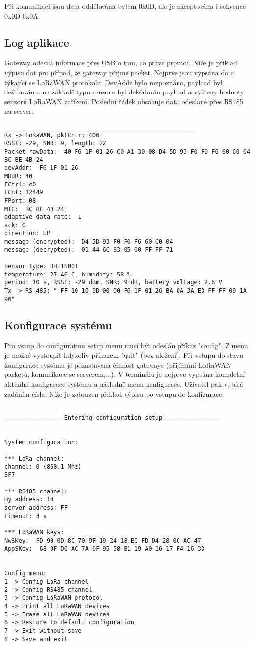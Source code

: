 Při komunikaci jsou data oddělována bytem 0x0D, ale je akceptována i sekvence 0x0D 0x0A. 

\subsection{Log aplikace}
Gateway odesílá informace přes USB o tom, co právě provádí. Níže je příklad výpisu dat pro případ, že gateway přijme packet. Nejprve jsou vypsána data týkající se LoRaWAN protokolu, DevAddr bylo rozpoznáno, payload byl dešifrován a na základě typu senzoru byl dekódován payload a vyčteny hodnoty senzorů LoRaWAN zařízení. Poslední řádek obsahuje data odeslané přes RS485 na server.


\begin{lstlisting}
______________________________________________________
Rx -> LoRaWAN, pktCntr: 406
RSSI: -29, SNR: 9, length: 22
Packet rawData:  40 F6 1F 01 26 C0 A1 30 08 D4 5D 93 F0 F0 F6 60 C0 04 BC BE 4B 24
devAddr:  F6 1F 01 26
MHDR: 40
FCtrl: c0
FCnt: 12449
FPort: 08
MIC:  BC BE 4B 24
adaptive data rate:  1
ack: 0
direction: UP
message (encrypted):  D4 5D 93 F0 F0 F6 60 C0 04
message (decrypted):  01 44 6C 83 05 00 FF FF 71

Sensor type: RHF1S001
temperature: 27.46 C, humidity: 58 %
period: 10 s, RSSI: -29 dBm, SNR: 9 dB, battery voltage: 2.6 V
Tx -> RS-485: " FF 10 10 0D 00 D0 F6 1F 01 26 BA 0A 3A E3 FF FF 09 1A 96"
\end{lstlisting}

\subsection{Konfigurace systému}
Pro vstup do configuration setup menu musí být odeslán příkaz "config". Z menu je možné vystoupit kdykoliv příkazem "quit" (bez uložení). 
Při vstupu do stavu konfigurace systému je pozastavena činnost gatewaye (přijímání LoRaWAN packetů, komunikace se serverem,...).
V terminálu je nejprve vypsána kompletní aktuální konfigurace systému a následně menu konfigurace. Uživatel pak vybírá zadáním čísla.
Níže je zobrazen příklad výpisu po vstupu do konfigurace.
\\

\begin{lstlisting}

_________________Entering configuration setup________________


System configuration:

*** LoRa channel: 
channel: 0 (868.1 Mhz)
SF7

*** RS485 channel: 
my address: 10
server address: FF
timeout: 3 s

*** LoRaWAN keys: 
NwSKey:  FD 90 0D 8C 70 9F 19 24 18 EC FD D4 28 0C AC 47
AppSKey:  68 9F D0 AC 7A 0F 95 58 B1 19 A0 16 17 F4 16 33


Config menu:
1 -> Config LoRa channel
2 -> Config RS485 channel
3 -> Config LoRaWAN protocol
4 -> Print all LoRaWAN devices
5 -> Erase all LoRaWAN devices
6 -> Restore to default configuration
7 -> Exit without save
8 -> Save and exit
\end{lstlisting}



